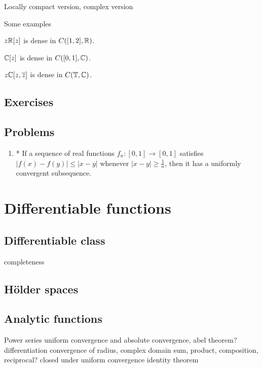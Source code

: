\documentclass{../../large}
\begin{document}
Locally compact version,
complex version








\begin{prb}
Some examples
\begin{parts}
\item $z\mathbb{R}[z]$ is dense in $C([1,2],\mathbb{R})$.
\item $\mathbb{C}[z]$ is dense in $C([0,1],\mathbb{C})$.
\item $z\mathbb{C}[z,\overline z]$ is dense in $C(\mathbb{T},\mathbb{C})$.
\end{parts}
\end{prb}







\section*{Exercises}
\begin{prb}
\end{prb}
\section*{Problems}
\begin{enumerate}
\item* If a sequence of real functions $f_n\colon[0,1]\to[0,1]$ satisfies $|f(x)-f(y)|\le|x-y|$ whenever $|x-y|\ge\frac1n$, then it has a uniformly convergent subsequence.
\end{enumerate}

\chapter{Differentiable functions}
\section{Differentiable class}
completeness
\section{H\"older spaces}

\section{Analytic functions}

Power series
uniform convergence and absolute convergence, abel theorem?
differentiation
convergence of radius, complex domain
sum, product, composition, reciprocal?
closed under uniform convergence
identity theorem
\end{document}
